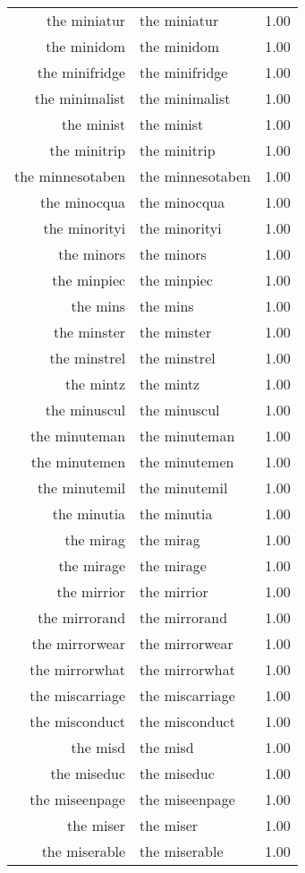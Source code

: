 \begin{table}[ht]
\begin{tabular}{rlr}
  the miniatur & the miniatur & 1.00 \\ 
  the minidom & the minidom & 1.00 \\ 
  the minifridge & the minifridge & 1.00 \\ 
  the minimalist & the minimalist & 1.00 \\ 
  the minist & the minist & 1.00 \\ 
  the minitrip & the minitrip & 1.00 \\ 
  the minnesotaben & the minnesotaben & 1.00 \\ 
  the minocqua & the minocqua & 1.00 \\ 
  the minorityi & the minorityi & 1.00 \\ 
  the minors & the minors & 1.00 \\ 
  the minpiec & the minpiec & 1.00 \\ 
  the mins & the mins & 1.00 \\ 
  the minster & the minster & 1.00 \\ 
  the minstrel & the minstrel & 1.00 \\ 
  the mintz & the mintz & 1.00 \\ 
  the minuscul & the minuscul & 1.00 \\ 
  the minuteman & the minuteman & 1.00 \\ 
  the minutemen & the minutemen & 1.00 \\ 
  the minutemil & the minutemil & 1.00 \\ 
  the minutia & the minutia & 1.00 \\ 
  the mirag & the mirag & 1.00 \\ 
  the mirage & the mirage & 1.00 \\ 
  the mirrior & the mirrior & 1.00 \\ 
  the mirrorand & the mirrorand & 1.00 \\ 
  the mirrorwear & the mirrorwear & 1.00 \\ 
  the mirrorwhat & the mirrorwhat & 1.00 \\ 
  the miscarriage & the miscarriage & 1.00 \\ 
  the misconduct & the misconduct & 1.00 \\ 
  the misd & the misd & 1.00 \\ 
  the miseduc & the miseduc & 1.00 \\ 
  the miseenpage & the miseenpage & 1.00 \\ 
  the miser & the miser & 1.00 \\ 
  the miserable & the miserable & 1.00 \\ 

\end{tabular}
\end{table}
